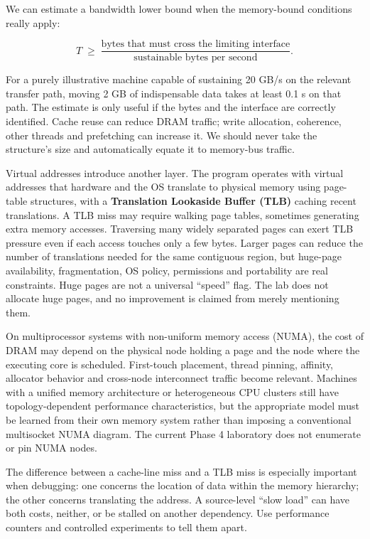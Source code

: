 We can estimate a bandwidth lower bound when the memory-bound conditions really apply:

\[
T \;\geq\; \frac{\text{bytes that must cross the limiting interface}}
                    {\text{sustainable bytes per second}}.
\]

For a purely illustrative machine capable of sustaining 20 GB/s on the relevant transfer path, moving 2 GB of indispensable data takes at least 0.1 s on that path. The estimate is only useful if the bytes and the interface are correctly identified. Cache reuse can reduce DRAM traffic; write allocation, coherence, other threads and prefetching can increase it. We should never take the structure's size and automatically equate it to memory-bus traffic.

Virtual addresses introduce another layer. The program operates with virtual addresses that hardware and the OS translate to physical memory using page-table structures, with a \textbf{Translation Lookaside Buffer (TLB)} caching recent translations. A TLB miss may require walking page tables, sometimes generating extra memory accesses. Traversing many widely separated pages can exert TLB pressure even if each access touches only a few bytes. Larger pages can reduce the number of translations needed for the same contiguous region, but huge-page availability, fragmentation, OS policy, permissions and portability are real constraints. Huge pages are not a universal ``speed'' flag. The lab does not allocate huge pages, and no improvement is claimed from merely mentioning them.

On multiprocessor systems with non-uniform memory access (NUMA), the cost of DRAM may depend on the physical node holding a page and the node where the executing core is scheduled. First-touch placement, thread pinning, affinity, allocator behavior and cross-node interconnect traffic become relevant. Machines with a unified memory architecture or heterogeneous CPU clusters still have topology-dependent performance characteristics, but the appropriate model must be learned from their own memory system rather than imposing a conventional multisocket NUMA diagram. The current Phase 4 laboratory does not enumerate or pin NUMA nodes.

The difference between a cache-line miss and a TLB miss is especially important when debugging: one concerns the location of data within the memory hierarchy; the other concerns translating the address. A source-level ``slow load'' can have both costs, neither, or be stalled on another dependency. Use performance counters and controlled experiments to tell them apart.

